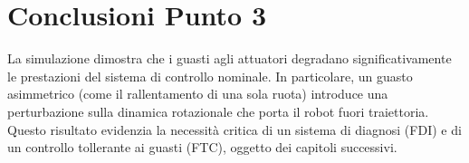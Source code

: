 \section{Conclusioni Punto 3}
La simulazione dimostra che i guasti agli attuatori degradano significativamente le prestazioni del sistema di controllo nominale. In particolare, un guasto asimmetrico (come il rallentamento di una sola ruota) introduce una perturbazione sulla dinamica rotazionale che porta il robot fuori traiettoria. Questo risultato evidenzia la necessità critica di un sistema di diagnosi (FDI) e di un controllo tollerante ai guasti (FTC), oggetto dei capitoli successivi.